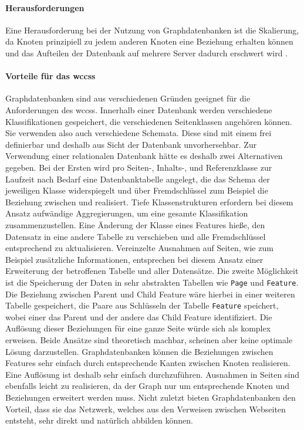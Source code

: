     \paragraph{Herausforderungen}
    Eine Herausforderung bei der Nutzung von Graphdatenbanken ist die Skalierung,
    da Knoten prinzipiell zu jedem anderen Knoten eine Beziehung erhalten können
    und das Aufteilen der Datenbank auf mehrere Server dadurch erschwert wird
    \cite[Kapitel 11.2.5]{sadalage:nosql}.

    \paragraph{Vorteile für das \glspl{wccs}}
    Graphdatenbanken sind aus verschiedenen Gründen geeignet für die Anforderungen des \glspl{wccs}.
    Innerhalb einer Datenbank werden verschiedene Klassifikationen gespeichert,
    die verschiedenen Seitenklassen angehören können.
    Sie verwenden also auch verschiedene Schemata.
    Diese sind mit einem {\classificationModel} frei definierbar und deshalb aus Sicht der Datenbank unvorhersehbar.
    Zur Verwendung einer relationalen Datenbank hätte es deshalb zwei Alternativen gegeben.
    Bei der Ersten wird pro Seiten-, Inhalts-, und Referenzklasse zur Laufzeit nach Bedarf eine Datenbanktabelle angelegt,
    die das Schema der jeweiligen Klasse widerspiegelt und über Fremdschlüssel zum Beispiel die Beziehung
    zwischen {\parentFeature} und {\childFeature} realisiert.
    Tiefe Klassenstrukturen erfordern bei diesem Ansatz aufwändige Aggregierungen,
    um eine gesamte Klassifikation zusammenzustellen.
    Eine Änderung der Klasse eines Features hieße, den Datensatz in eine andere Tabelle zu verschieben
    und alle Fremdschlüssel entsprechend zu aktualisieren.
    Vereinzelte Ausnahmen auf Seiten, wie zum Beispiel zusätzliche Informationen, entsprechen bei diesem Ansatz
    einer Erweiterung der betroffenen Tabelle und aller Datensätze.
    Die zweite Möglichkeit ist die Speicherung der Daten in sehr abstrakten Tabellen
    wie \texttt{Page} und \texttt{Feature}.
    Die Beziehung zwischen Parent und Child Feature wäre hierbei in einer weiteren Tabelle gespeichert,
    die Paare aus Schlüsseln der Tabelle \texttt{Feature} speichert, wobei einer das Parent und der andere das
    Child Feature identifiziert.
    Die Auflösung dieser Beziehungen für eine ganze Seite würde sich als komplex erweisen.
    Beide Ansätze sind theoretisch machbar, scheinen aber keine optimale Lösung darzustellen.
    Graphdatenbanken können die Beziehungen zwischen Features sehr einfach durch entsprechende Kanten zwischen Knoten realisieren.
    Eine Auflösung ist deshalb sehr einfach durchzuführen.
    Ausnahmen in Seiten sind ebenfalls leicht zu realisieren,
    da der Graph nur um entsprechende Knoten und Beziehungen erweitert werden muss.
    Nicht zuletzt bieten Graphdatenbanken den Vorteil,
    dass sie das Netzwerk, welches aus den Verweisen zwischen
    Webseiten entsteht, sehr direkt und natürlich abbilden können.
